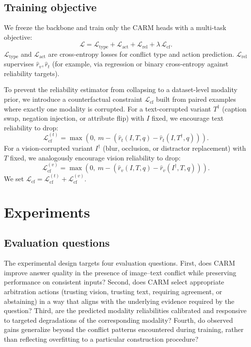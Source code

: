 \documentclass{article}
\begin{document}
\subsection{Training objective}
We freeze the backbone and train only the CARM heads with a multi-task objective:
\[
\mathcal{L} = \mathcal{L}_{\text{type}} + \mathcal{L}_{\text{act}} + \mathcal{L}_{\text{rel}} + \lambda\, \mathcal{L}_{\text{cf}}.
\]
$\mathcal{L}_{\text{type}}$ and $\mathcal{L}_{\text{act}}$ are cross-entropy losses for conflict type and action prediction. $\mathcal{L}_{\text{rel}}$ supervises $\hat{r}_v,\hat{r}_t$ (for example, via regression or binary cross-entropy against reliability targets).

To prevent the reliability estimator from collapsing to a dataset-level modality prior, we introduce a counterfactual constraint $\mathcal{L}_{\text{cf}}$ built from paired examples where exactly one modality is corrupted. For a text-corrupted variant $T^{\dagger}$ (caption swap, negation injection, or attribute flip) with $I$ fixed, we encourage text reliability to drop:
\[
\mathcal{L}_{\text{cf}}^{(t)} = \max\!\left(0,\ m - \left(\hat{r}_t(I,T,q) - \hat{r}_t(I,T^{\dagger},q)\right)\right).
\]
For a vision-corrupted variant $I^{\dagger}$ (blur, occlusion, or distractor replacement) with $T$ fixed, we analogously encourage vision reliability to drop:
\[
\mathcal{L}_{\text{cf}}^{(v)} = \max\!\left(0,\ m - \left(\hat{r}_v(I,T,q) - \hat{r}_v(I^{\dagger},T,q)\right)\right).
\]
We set $\mathcal{L}_{\text{cf}} = \mathcal{L}_{\text{cf}}^{(t)} + \mathcal{L}_{\text{cf}}^{(v)}$.


\section{Experiments}
\label{sec:experiments}

\subsection{Evaluation questions}
The experimental design targets four evaluation questions. First, does CARM improve answer quality in the presence of image--text conflict while preserving performance on consistent inputs? Second, does CARM select appropriate arbitration actions (trusting vision, trusting text, requiring agreement, or abstaining) in a way that aligns with the underlying evidence required by the question? Third, are the predicted modality reliabilities calibrated and responsive to targeted degradations of the corresponding modality? Fourth, do observed gains generalize beyond the conflict patterns encountered during training, rather than reflecting overfitting to a particular construction procedure?
\end{document}
